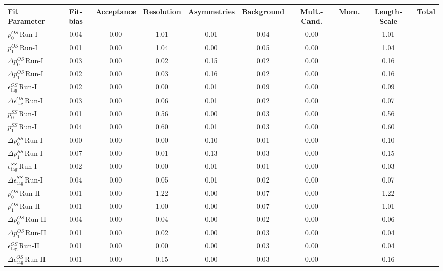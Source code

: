 \begin{tabular}{l  c  c  c  c  c  c  c  | c }
\hline
\hline
Fit Parameter & Fit-bias & Acceptance & Resolution & Asymmetries & Background & Mult.-Cand. & Mom. & Length-Scale &  Total  \\ 
\hline
$p_{0}^{OS} \, \text{Run-I}$ & 0.04 & 0.00 & 1.01 & 0.01 & 0.04 & 0.00 &  & 1.01 \\ 
$p_{1}^{OS} \, \text{Run-I}$ & 0.01 & 0.00 & 1.04 & 0.00 & 0.05 & 0.00 &  & 1.04 \\ 
$\Delta p_{0}^{OS} \, \text{Run-I}$ & 0.03 & 0.00 & 0.02 & 0.15 & 0.02 & 0.00 &  & 0.16 \\ 
$\Delta p_{1}^{OS} \, \text{Run-I}$ & 0.02 & 0.00 & 0.03 & 0.16 & 0.02 & 0.00 &  & 0.16 \\ 
$\epsilon_{\text{tag}}^{OS} \, \text{Run-I}$ & 0.02 & 0.00 & 0.00 & 0.01 & 0.09 & 0.00 &  & 0.09 \\ 
$\Delta \epsilon_{\text{tag}}^{OS} \, \text{Run-I}$ & 0.03 & 0.00 & 0.06 & 0.01 & 0.02 & 0.00 &  & 0.07 \\ 
$p_{0}^{SS} \, \text{Run-I}$ & 0.01 & 0.00 & 0.56 & 0.00 & 0.03 & 0.00 &  & 0.56 \\ 
$p_{1}^{SS} \, \text{Run-I}$ & 0.04 & 0.00 & 0.60 & 0.01 & 0.03 & 0.00 &  & 0.60 \\ 
$\Delta p_{0}^{SS} \, \text{Run-I}$ & 0.00 & 0.00 & 0.00 & 0.10 & 0.01 & 0.00 &  & 0.10 \\ 
$\Delta p_{1}^{SS} \, \text{Run-I}$ & 0.07 & 0.00 & 0.01 & 0.13 & 0.03 & 0.00 &  & 0.15 \\ 
$\epsilon_{\text{tag}}^{SS} \, \text{Run-I}$ & 0.02 & 0.00 & 0.00 & 0.01 & 0.01 & 0.00 &  & 0.03 \\ 
$\Delta \epsilon_{\text{tag}}^{SS} \, \text{Run-I}$ & 0.04 & 0.00 & 0.05 & 0.01 & 0.02 & 0.00 &  & 0.07 \\ 
$p_{0}^{OS} \, \text{Run-II}$ & 0.01 & 0.00 & 1.22 & 0.00 & 0.07 & 0.00 &  & 1.22 \\ 
$p_{1}^{OS} \, \text{Run-II}$ & 0.01 & 0.00 & 1.00 & 0.00 & 0.07 & 0.00 &  & 1.01 \\ 
$\Delta p_{0}^{OS} \, \text{Run-II}$ & 0.04 & 0.00 & 0.04 & 0.00 & 0.02 & 0.00 &  & 0.06 \\ 
$\Delta p_{1}^{OS} \, \text{Run-II}$ & 0.01 & 0.00 & 0.02 & 0.00 & 0.03 & 0.00 &  & 0.04 \\ 
$\epsilon_{\text{tag}}^{OS} \, \text{Run-II}$ & 0.01 & 0.00 & 0.00 & 0.00 & 0.03 & 0.00 &  & 0.04 \\ 
$\Delta \epsilon_{\text{tag}}^{OS} \, \text{Run-II}$ & 0.01 & 0.00 & 0.15 & 0.00 & 0.03 & 0.00 &  & 0.16 \\ 

\end{tabular}
